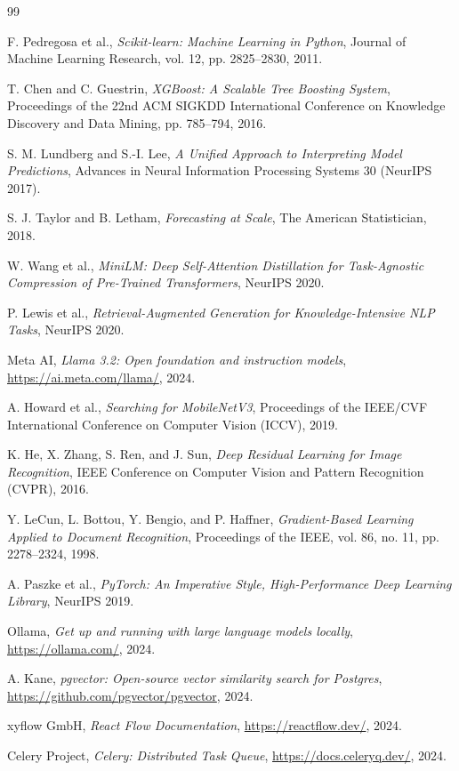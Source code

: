 \documentclass[12pt, a4paper]{report}
\begin{document}
\begin{thebibliography}{99}

F. Pedregosa et al.,
\textit{Scikit-learn: Machine Learning in Python},
Journal of Machine Learning Research, vol. 12, pp. 2825--2830, 2011.

T. Chen and C. Guestrin,
\textit{XGBoost: A Scalable Tree Boosting System},
Proceedings of the 22nd ACM SIGKDD International Conference on
Knowledge Discovery and Data Mining, pp. 785--794, 2016.

S. M. Lundberg and S.-I. Lee,
\textit{A Unified Approach to Interpreting Model Predictions},
Advances in Neural Information Processing Systems 30 (NeurIPS 2017).

S. J. Taylor and B. Letham,
\textit{Forecasting at Scale}, The American Statistician, 2018.

W. Wang et al.,
\textit{MiniLM: Deep Self-Attention Distillation for Task-Agnostic
Compression of Pre-Trained Transformers}, NeurIPS 2020.

P. Lewis et al.,
\textit{Retrieval-Augmented Generation for Knowledge-Intensive NLP
Tasks}, NeurIPS 2020.

Meta AI,
\textit{Llama 3.2: Open foundation and instruction models},
\url{https://ai.meta.com/llama/}, 2024.

A. Howard et al.,
\textit{Searching for MobileNetV3},
Proceedings of the IEEE/CVF International Conference on Computer
Vision (ICCV), 2019.

K. He, X. Zhang, S. Ren, and J. Sun,
\textit{Deep Residual Learning for Image Recognition},
IEEE Conference on Computer Vision and Pattern Recognition (CVPR), 2016.

Y. LeCun, L. Bottou, Y. Bengio, and P. Haffner,
\textit{Gradient-Based Learning Applied to Document Recognition},
Proceedings of the IEEE, vol. 86, no. 11, pp. 2278--2324, 1998.

A. Paszke et al.,
\textit{PyTorch: An Imperative Style, High-Performance Deep Learning
Library}, NeurIPS 2019.

Ollama,
\textit{Get up and running with large language models locally},
\url{https://ollama.com/}, 2024.

A. Kane,
\textit{pgvector: Open-source vector similarity search for Postgres},
\url{https://github.com/pgvector/pgvector}, 2024.

xyflow GmbH,
\textit{React Flow Documentation},
\url{https://reactflow.dev/}, 2024.

Celery Project,
\textit{Celery: Distributed Task Queue},
\url{https://docs.celeryq.dev/}, 2024.

\end{thebibliography}
\end{document}

